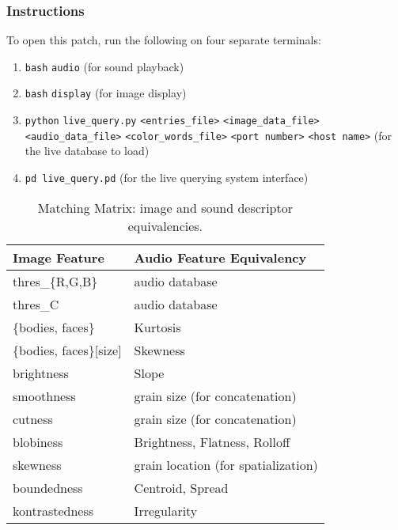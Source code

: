 \subsubsection{Instructions}

To open this patch, run the following on four separate terminals:

\begin{enumerate}
\footnotesize
\singlespacing
\item \texttt{bash} \texttt{audio} (for sound playback)
\item \texttt{bash} \texttt{display} (for image display)
\item \texttt{python} \texttt{live\_query.py} \texttt{<entries\_file>} \texttt{<image\_data\_file>} \texttt{<audio\_data\_file>} \texttt{<color\_words\_file>} \texttt{<port number>} \texttt{<host name>} (for the live database to load)
\item \texttt{pd live\_query.pd} (for the live querying system interface)
\end{enumerate}



\begin{table}
\begin{tabular}{l | l}
Image Feature & Audio Feature Equivalency \tabularnewline\hline

thres\_\{R,G,B\} & audio database \tabularnewline\hline

thres\_C & audio database\tabularnewline\hline

\{bodies, faces\} & Kurtosis\tabularnewline\hline

\{bodies, faces\}{[}size{]} & Skewness\tabularnewline\hline

brightness & Slope\tabularnewline\hline

smoothness & grain size (for concatenation)\tabularnewline\hline


cutness & grain size (for concatenation)\tabularnewline\hline

blobiness & Brightness, Flatness, Rolloff\tabularnewline\hline

skewness & grain location (for spatialization)\tabularnewline\hline

boundedness & Centroid, Spread\tabularnewline\hline

kontrastedness & Irregularity\tabularnewline\hline
\end{tabular}
\label{tab:matching}
\caption{Matching Matrix: image and sound descriptor equivalencies.}
\end{table}









